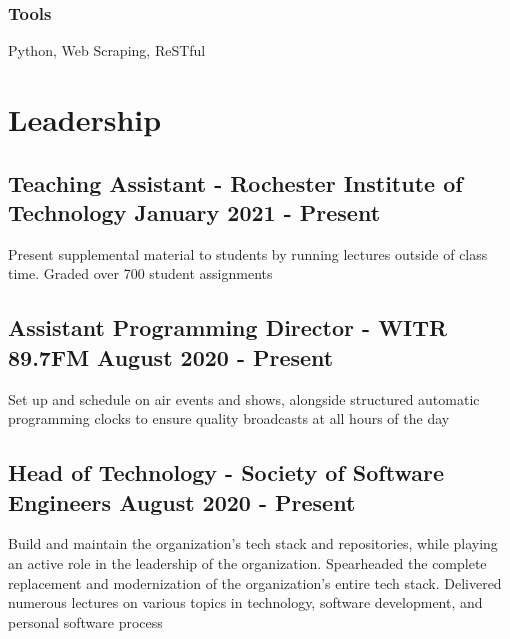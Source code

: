 \documentclass[11pt, letterpaper]{article}
\begin{document}
            \subsubsection{Tools}
                Python, Web Scraping, ReSTful

    \section{Leadership}
        \subsection{Teaching Assistant - Rochester Institute of Technology \hfill January 2021 - Present}
        Present supplemental material to students by running lectures outside of class time. 
        Graded over 700 student assignments
        \vspace{.5em}

        \subsection{Assistant Programming Director - WITR 89.7FM \hfill August 2020 - Present}
        Set up and schedule on air events and shows, alongside structured automatic programming clocks to 
        ensure quality broadcasts at all hours of the day
        \vspace{.5em}

        \subsection{Head of Technology - Society of Software Engineers \hfill August 2020 - Present}
        Build and maintain the organization's tech stack and repositories, while playing an active role 
        in the leadership of the organization. Spearheaded the complete replacement and modernization of 
        the organization's entire tech stack.
        Delivered numerous lectures on various topics in technology, software development, 
        and personal software process
\end{document}

